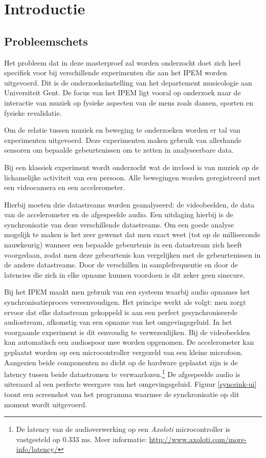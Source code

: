 \chapter{Introductie}

\section{Probleemschets}
\label{probleemschets}

Het probleem dat in deze masterproef zal worden onderzocht doet zich heel specifiek voor bij verschillende experimenten die aan het IPEM worden uitgevoerd. Dit is de onderzoeksinstelling van het departement musicologie aan Universiteit Gent. De focus van het IPEM ligt vooral op onderzoek naar de interactie van muziek op fysieke aspecten van de mens zoals dansen, sporten en fysieke revalidatie. \cite{ipem2016}

Om de relatie tussen muziek en beweging te onderzoeken worden er tal van experimenten uitgevoerd. Deze experimenten maken gebruik van allerhande sensoren om bepaalde gebeurtenissen om te zetten in analyseerbare data. 

Bij een klassiek experiment wordt onderzocht wat de invloed is van muziek op de lichamelijke activiteit van een persoon. Alle bewegingen worden geregistreerd met een videocamera en een accelerometer.

Hierbij moeten drie datastreams worden geanalyseerd: de videobeelden, de data van de accelerometer en de afgespeelde audio. Een  uitdaging hierbij is de synchronisatie van deze verschillende datastreams. Om een goede analyse mogelijk te maken is het zeer gewenst dat men exact weet (tot op de milliseconde nauwkeurig) wanneer een bepaalde gebeurtenis in een datastream zich heeft voorgedaan, zodat men deze gebeurtenis kan vergelijken met de gebeurtenissen in de andere datastreams. Door de verschillen in samplefrequentie en door de latencies die zich in elke opname kunnen voordoen is dit zeker geen sinecure. \cite{six2015multimodal}

Bij het IPEM maakt men gebruik van een systeem waarbij audio opnames het synchronisatieproces vereenvoudigen. Het principe werkt als volgt: men zorgt ervoor dat elke datastream gekoppeld is aan een perfect gesynchroniseerde audiostream, afkomstig van een opname van het omgevingsgeluid. In het voorgaande experiment is dit eenvoudig te verwezenlijken. Bij de videobeelden kan automatisch een audiospoor mee worden opgenomen. De accelerometer kan geplaatst worden op een microcontroller vergezeld van een kleine microfoon. Aangezien beide componenten zo dicht op de hardware geplaatst zijn is de latency tussen beide datastromen te verwaarlozen.\footnote{De latency van de audioverwerking op een \textit{Axoloti} microcontroller is vastgesteld op 0.333 ms. Meer informatie: \url{http://www.axoloti.com/more-info/latency/}} De afgespeelde audio is uiteraard al een perfecte weergave van het omgevingsgeluid. Figuur \ref{syncsink-ui} toont een screenshot van het programma waarmee de synchronisatie op dit moment wordt uitgevoerd.

